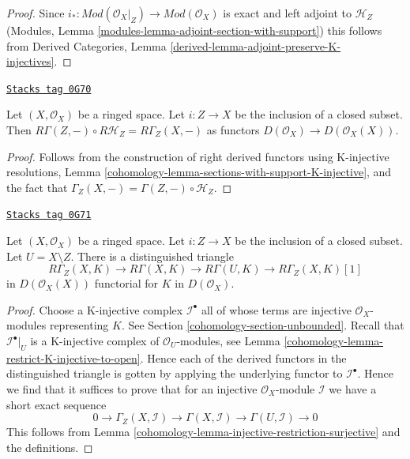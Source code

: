 \begin{proof}
Since $i_* : \textit{Mod}(\mathcal{O}_X|_Z) \to \textit{Mod}(\mathcal{O}_X)$
is exact and left adjoint to $\mathcal{H}_Z$
(Modules, Lemma \ref{modules-lemma-adjoint-section-with-support})
this follows from
Derived Categories, Lemma \ref{derived-lemma-adjoint-preserve-K-injectives}.
\end{proof}

\begin{lemma}
\label{cohomology-lemma-local-to-global-sections-with-support}
\href{https://stacks.math.columbia.edu/tag/0G70}{\texttt{Stacks tag 0G70}}

Let $(X, \mathcal{O}_X)$ be a ringed space. Let $i : Z \to X$ be the
inclusion of a closed subset. Then
$R\Gamma(Z, - ) \circ R\mathcal{H}_Z = R\Gamma_Z(X, - )$
as functors $D(\mathcal{O}_X) \to D(\mathcal{O}_X(X))$.
\end{lemma}

\begin{proof}

Follows from the construction of right derived functors using
K-injective resolutions, Lemma \ref{cohomology-lemma-sections-with-support-K-injective},
and the fact that $\Gamma_Z(X, -) = \Gamma(Z, -) \circ \mathcal{H}_Z$.
\end{proof}

\begin{lemma}
\label{cohomology-lemma-triangle-sections-with-support}
\href{https://stacks.math.columbia.edu/tag/0G71}{\texttt{Stacks tag 0G71}}

Let $(X, \mathcal{O}_X)$ be a ringed space. Let $i : Z \to X$ be the
inclusion of a closed subset. Let $U = X \setminus Z$.
There is a distinguished triangle
$$
R\Gamma_Z(X, K) \to R\Gamma(X, K) \to R\Gamma(U, K) \to
R\Gamma_Z(X, K)[1]
$$
in $D(\mathcal{O}_X(X))$ functorial for $K$ in $D(\mathcal{O}_X)$.
\end{lemma}

\begin{proof}

Choose a K-injective complex $\mathcal{I}^\bullet$ all of whose terms
are injective $\mathcal{O}_X$-modules representing $K$. See
Section \ref{cohomology-section-unbounded}. Recall that $\mathcal{I}^\bullet|_U$
is a K-injective complex of $\mathcal{O}_U$-modules, see
Lemma \ref{cohomology-lemma-restrict-K-injective-to-open}. Hence each
of the derived functors in the distinguished triangle is gotten
by applying the underlying functor to $\mathcal{I}^\bullet$.
Hence we find that it suffices to prove that
for an injective $\mathcal{O}_X$-module $\mathcal{I}$ we have
a short exact sequence
$$
0 \to \Gamma_Z(X, \mathcal{I}) \to \Gamma(X, \mathcal{I})
\to \Gamma(U, \mathcal{I}) \to 0
$$
This follows from Lemma \ref{cohomology-lemma-injective-restriction-surjective}
and the definitions.
\end{proof}

